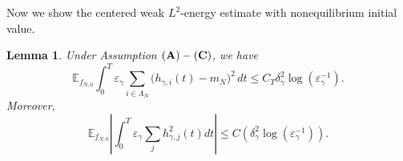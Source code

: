 \documentclass{article}
\newtheorem{lemma}{Lemma}
\begin{document}
Now we show the centered weak \(L^2\)-energy estimate with nonequilibrium initial value.

\begin{lemma}\label{lem:weak-L2-h-from-microscopic}
Under Assumption \(({\bf A})-({\bf C})\), we have
\begin{equation}\label{eq:weak-L2-h-energy-critical-rate}
\mathbb E_{f_{N,0}}\int_0^T\varepsilon_\gamma\sum_{i\in\Lambda_N} \bigl(h_{\gamma,i}(t)-m_N\bigr)^2\,dt
\le C_T\delta_\gamma^2\log(\varepsilon_\gamma^{-1}).
\end{equation}
Moreover,
\begin{equation}
\label{eq:clean-critical-centered-energy}
\mathbb E_{f_{N,0}}
\left|\int_0^T\varepsilon_\gamma\sum_j h^2_{\gamma,j}(t)dt\right| \le  C\left( \delta_\gamma^2\log(\varepsilon_\gamma^{-1}) \right).
\end{equation}
\end{lemma}
\end{document}
